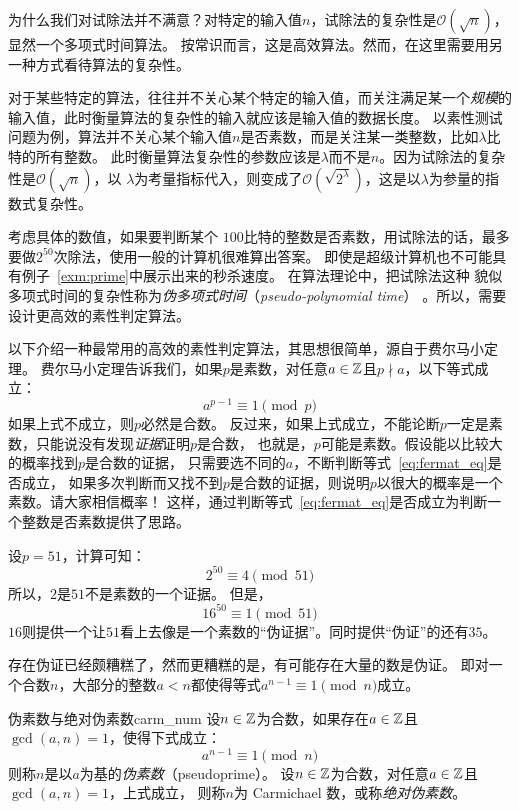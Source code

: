 为什么我们对试除法并不满意？对特定的输入值$n$，试除法的复杂性是$\mathcal{O}(\sqrt{n})$，显然一个多项式时间算法。
按常识而言，这是高效算法。然而，在这里需要用另一种方式看待算法的复杂性。

对于某些特定的算法，往往并不关心某个特定的输入值，而关注满足某一个\emph{规模}的输入值，此时衡量算法的复杂性的输入就应该是输入值的数据长度。
以素性测试问题为例，算法并不关心某个输入值$n$是否素数，而是关注某一类整数，比如$\lambda$比特的所有整数。
此时衡量算法复杂性的参数应该是$\lambda$而不是$n$。因为试除法的复杂性是$\mathcal{O}(\sqrt{n})$，以
$\lambda$为考量指标代入，则变成了$\mathcal{O}(\sqrt{2^{\lambda}})$，这是以$\lambda$为参量的指数式复杂性。

考虑具体的数值，如果要判断某个
$100$比特的整数是否素数，用试除法的话，最多要做$2^{50}$次除法，使用一般的计算机很难算出答案。
即使是超级计算机也不可能具有例子~\ref{exm:prime}中展示出来的秒杀速度。
在算法理论中，把试除法这种
貌似多项式时间的复杂性称为\emph{伪多项式时间}（\emph{pseudo-polynomial time}）
。所以，需要设计更高效的素性判定算法。

以下介绍一种最常用的高效的素性判定算法，其思想很简单，源自于费尔马小定理。
费尔马小定理告诉我们，如果$p$是素数，对任意$a \in {\mathbb Z}$且$p \nmid a$，以下等式成立：
\begin{equation}
\label{eq:fermat_eq}
a^{p-1} \equiv 1 \pmod{p}
\end{equation}
如果上式不成立，则$p$必然是合数。
反过来，如果上式成立，不能论断$p$一定是素数，只能说没有发现\emph{证据}证明$p$是合数，
也就是，$p$可能是素数。假设能以比较大的概率找到$p$是合数的证据，
只需要选不同的$a$，不断判断等式~\ref{eq:fermat_eq}是否成立，
如果多次判断而又找不到$p$是合数的证据，则说明$p$以很大的概率是一个素数。请大家相信概率！
这样，通过判断等式~\ref{eq:fermat_eq}是否成立为判断一个整数是否素数提供了思路。

\begin{example}
设$p=51$，计算可知：
\[2^{50} \equiv 4 \pmod{51}\]
所以，$2$是$51$不是素数的一个证据。
但是，
\[16^{50} \equiv 1 \pmod{51}\]
$16$则提供一个让$51$看上去像是一个素数的“伪证据”。同时提供“伪证”的还有$35$。
\end{example}

存在伪证已经颇糟糕了，然而更糟糕的是，有可能存在大量的数是伪证。
即对一个合数$n$，大部分的整数$a < n$都使得等式$a^{n-1} \equiv 1 \pmod{n}$成立。

\begin{definition}{伪素数与绝对伪素数}{carm_num}
设$n\in {\mathbb Z}$为合数，如果存在$a \in {\mathbb Z}$且$\gcd(a, n)=1$，使得下式成立：
\[ a^{n-1} \equiv 1 \pmod{n}\]
则称$n$是以$a$为基的\emph{伪素数}（pseudoprime）。
设$n\in {\mathbb Z}$为合数，对任意$a \in {\mathbb Z}$且$\gcd(a, n)=1$，上式成立，
则称$n$为 Carmichael 数，或称\emph{绝对伪素数}。
\end{definition}

